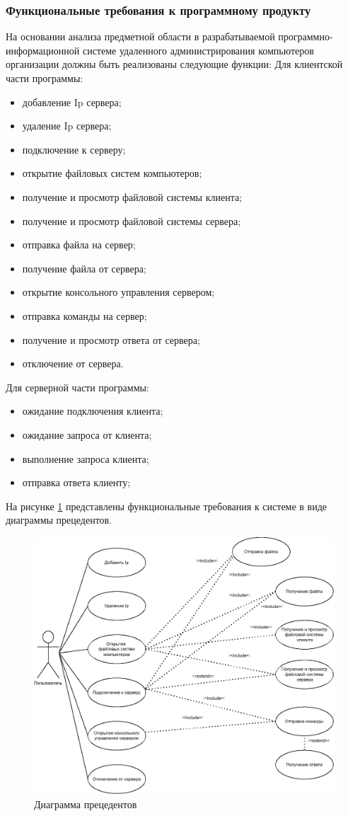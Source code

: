 \subsubsection{Функциональные требования к программному продукту}
На основании анализа предметной области в разрабатываемой программно-информационной системе удаленного администрирования компьютеров организации должны быть реализованы следующие функции:
Для клиентской части программы:
\begin{itemize}
	\item добавление Ip сервера;
	\item удаление Ip сервера;
	\item подключение к серверу;
	\item открытие файловых систем компьютеров;
	\item получение и просмотр файловой системы клиента;
	\item получение и просмотр файловой системы сервера;
	\item отправка файла на сервер;
	\item получение файла от сервера;
	\item открытие консольного управления сервером;
	\item отправка команды на сервер;
	\item получение и просмотр ответа от сервера;
	\item отключение от сервера.
\end{itemize}
Для серверной части программы:
\begin{itemize}
	\item ожидание подключения клиента;
	\item ожидание запроса от клиента;
	\item выполнение запроса клиента;
	\item отправка ответа клиенту;
\end{itemize}

На рисунке \ref{fig:-use_case_diagram} представлены функциональные требования к системе в виде диаграммы прецедентов.
\begin{figure}
	\centering
	\includegraphics[width=0.7\linewidth]{"images/Диаграмма прецедентов"}
	\caption{Диаграмма прецедентов}
	\label{fig:-use_case_diagram}
\end{figure}

